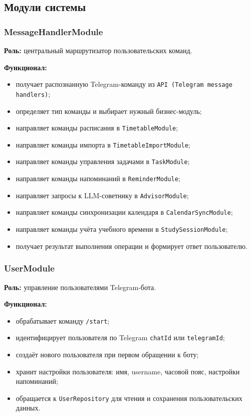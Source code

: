 \documentclass[10pt,a4paper,final]{article} %
\begin{document}
\subsection{Модули системы}

\subsubsection{MessageHandlerModule}

\textbf{Роль:} центральный маршрутизатор пользовательских команд.

\textbf{Функционал:}
\begin{itemize}
    \item получает распознанную Telegram-команду из \texttt{API (Telegram message handlers)};
    \item определяет тип команды и выбирает нужный бизнес-модуль;
    \item направляет команды расписания в \texttt{TimetableModule};
    \item направляет команды импорта в \texttt{TimetableImportModule};
    \item направляет команды управления задачами в \texttt{TaskModule};
    \item направляет команды напоминаний в \texttt{ReminderModule};
    \item направляет запросы к LLM-советнику в \texttt{AdvisorModule};
    \item направляет команды синхронизации календаря в \texttt{CalendarSyncModule};
    \item направляет команды учёта учебного времени в \texttt{StudySessionModule};
    \item получает результат выполнения операции и формирует ответ пользователю.
\end{itemize}

\subsubsection{UserModule}

\textbf{Роль:} управление пользователями Telegram-бота.

\textbf{Функционал:}
\begin{itemize}
    \item обрабатывает команду \texttt{/start};
    \item идентифицирует пользователя по Telegram \texttt{chatId} или
    \texttt{telegramId};
    \item создаёт нового пользователя при первом обращении к боту;
    \item хранит настройки пользователя: имя, username, часовой пояс,
    настройки напоминаний;
    \item обращается к \texttt{UserRepository} для чтения и сохранения
    пользовательских данных.
\end{itemize}
\end{document}
